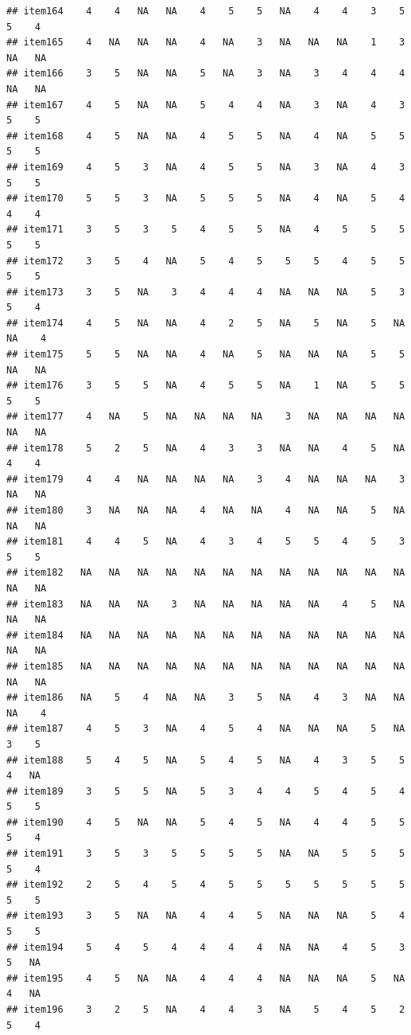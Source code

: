 \documentclass[
  man]{apa6}
\begin{document}
\begin{verbatim}
## item164    4    4   NA   NA    4    5    5   NA    4    4    3    5    5    4
## item165    4   NA   NA   NA    4   NA    3   NA   NA   NA    1    3   NA   NA
## item166    3    5   NA   NA    5   NA    3   NA    3    4    4    4   NA   NA
## item167    4    5   NA   NA    5    4    4   NA    3   NA    4    3    5    5
## item168    4    5   NA   NA    4    5    5   NA    4   NA    5    5    5    5
## item169    4    5    3   NA    4    5    5   NA    3   NA    4    3    5    5
## item170    5    5    3   NA    5    5    5   NA    4   NA    5    4    4    4
## item171    3    5    3    5    4    5    5   NA    4    5    5    5    5    5
## item172    3    5    4   NA    5    4    5    5    5    4    5    5    5    5
## item173    3    5   NA    3    4    4    4   NA   NA   NA    5    3    5    4
## item174    4    5   NA   NA    4    2    5   NA    5   NA    5   NA   NA    4
## item175    5    5   NA   NA    4   NA    5   NA   NA   NA    5    5   NA   NA
## item176    3    5    5   NA    4    5    5   NA    1   NA    5    5    5    5
## item177    4   NA    5   NA   NA   NA   NA    3   NA   NA   NA   NA   NA   NA
## item178    5    2    5   NA    4    3    3   NA   NA    4    5   NA    4    4
## item179    4    4   NA   NA   NA   NA    3    4   NA   NA   NA    3   NA   NA
## item180    3   NA   NA   NA    4   NA   NA    4   NA   NA    5   NA   NA   NA
## item181    4    4    5   NA    4    3    4    5    5    4    5    3    5    5
## item182   NA   NA   NA   NA   NA   NA   NA   NA   NA   NA   NA   NA   NA   NA
## item183   NA   NA   NA    3   NA   NA   NA   NA   NA    4    5   NA   NA   NA
## item184   NA   NA   NA   NA   NA   NA   NA   NA   NA   NA   NA   NA   NA   NA
## item185   NA   NA   NA   NA   NA   NA   NA   NA   NA   NA   NA   NA   NA   NA
## item186   NA    5    4   NA   NA    3    5   NA    4    3   NA   NA   NA    4
## item187    4    5    3   NA    4    5    4   NA   NA   NA    5   NA    3    5
## item188    5    4    5   NA    5    4    5   NA    4    3    5    5    4   NA
## item189    3    5    5   NA    5    3    4    4    5    4    5    4    5    5
## item190    4    5   NA   NA    5    4    5   NA    4    4    5    5    5    4
## item191    3    5    3    5    5    5    5   NA   NA    5    5    5    5    4
## item192    2    5    4    5    4    5    5    5    5    5    5    5    5    5
## item193    3    5   NA   NA    4    4    5   NA   NA   NA    5    4    5    5
## item194    5    4    5    4    4    4    4   NA   NA    4    5    3    5   NA
## item195    4    5   NA   NA    4    4    4   NA   NA   NA    5   NA    4   NA
## item196    3    2    5   NA    4    4    3   NA    5    4    5    2    5    4

\end{verbatim}
\end{document}
